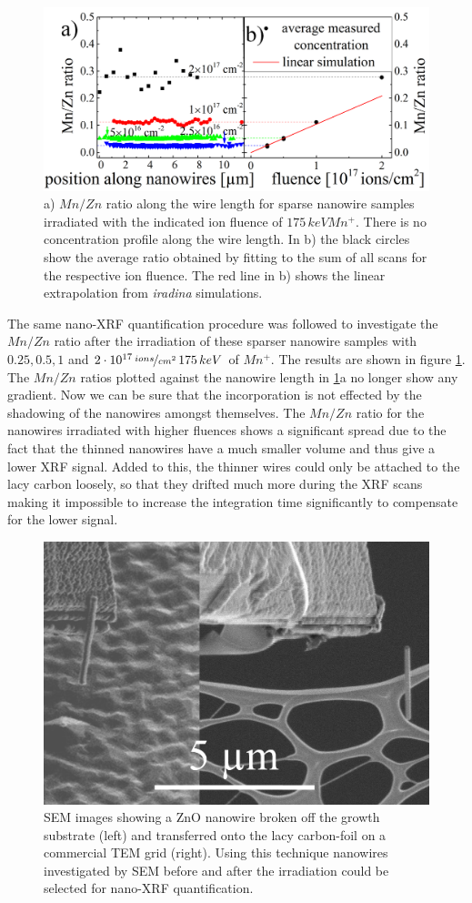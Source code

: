  

\begin{figure}[th]
	\centering
		\includegraphics[width=.85\textwidth]{images/MnZn2.png}
	\caption{a) $Mn/Zn$ ratio along the wire length for sparse nanowire samples irradiated with the indicated ion fluence of $175\,keV Mn^+$. There is no concentration profile along the wire length. In b) the black circles show the average ratio obtained by fitting to the sum of all scans for the respective ion fluence. The red line in b) shows the linear extrapolation from \emph{iradina} simulations. }
	\label{MnZn2}
\end{figure} 
The same nano-XRF quantification procedure was followed to investigate the $Mn/Zn$ ratio after the irradiation of these sparser nanowire samples with $0.25, 0.5, 1$ and $2\cdot 10^{17}\,\nicefrac{ions}{cm^2}\,175\,keV$ of $Mn^+$. The results are shown in figure \ref{MnZn2}. The $Mn/Zn$ ratios plotted against the nanowire length in \ref{MnZn2}a no longer show any gradient. Now we can be sure that the incorporation is not effected by the shadowing of the nanowires amongst themselves. The $Mn/Zn$ ratio for the nanowires irradiated with higher fluences shows a significant spread due to the fact that the thinned nanowires have a much smaller volume and thus give a lower XRF signal. Added to this, the thinner wires could only be attached to the lacy carbon loosely, so that they drifted much more during the XRF scans making it impossible to increase the integration time significantly to compensate for the lower signal. 

\begin{figure}
	\centering
		\includegraphics[width=.5\textwidth]{images/SEMbreak.png}
	\caption{SEM images showing a ZnO nanowire broken off the growth substrate (left) and transferred onto the lacy carbon-foil on a commercial TEM grid (right). Using this technique nanowires investigated by SEM before and after the irradiation could be selected for nano-XRF quantification.}
	\label{SEMbreak}
\end{figure}


